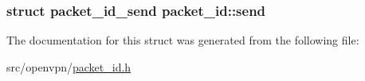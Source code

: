 \subsubsection[{send}]{\setlength{\rightskip}{0pt plus 5cm}struct {\bf packet\+\_\+id\+\_\+send} packet\+\_\+id\+::send}\label{structpacket__id_a3bbfd45d7cf1f212388801261ca8dfae}


The documentation for this struct was generated from the following file\+:\begin{DoxyCompactItemize}
\item 
src/openvpn/\hyperlink{packet__id_8h}{packet\+\_\+id.\+h}\end{DoxyCompactItemize}
